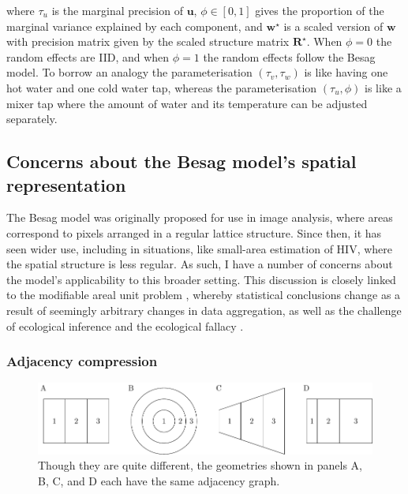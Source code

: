 \documentclass[a4paper, nobind]{templates/ociamthesis}
\begin{document}
where \(\tau_u\) is the marginal precision of \(\mathbf{u}\), \(\phi \in [0, 1]\) gives the proportion of the marginal variance explained by each component, and \(\mathbf{w}^\star\) is a scaled version of \(\mathbf{w}\) with precision matrix given by the scaled structure matrix \(\mathbf{R}^\star\).
When \(\phi = 0\) the random effects are IID, and when \(\phi = 1\) the random effects follow the Besag model.
To borrow an analogy \autocite{rue2020comment} the parameterisation \((\tau_v, \tau_w)\) is like having one hot water and one cold water tap, whereas the parameterisation \((\tau_u, \phi)\) is like a mixer tap where the amount of water and its temperature can be adjusted separately.

\hypertarget{concerns-about-the-besag-models-spatial-representation}{%
\subsection{Concerns about the Besag model's spatial representation}\label{concerns-about-the-besag-models-spatial-representation}}

The Besag model was originally proposed for use in image analysis, where areas correspond to pixels arranged in a regular lattice structure.
Since then, it has seen wider use, including in situations, like small-area estimation of HIV, where the spatial structure is less regular.
As such, I have a number of concerns about the model's applicability to this broader setting.
This discussion is closely linked to the modifiable areal unit problem \autocite{openshow1979million}, whereby statistical conclusions change as a result of seemingly arbitrary changes in data aggregation, as well as the challenge of ecological inference and the ecological fallacy \autocite{wakefield2010aggregation}.

\hypertarget{adjacency-compression}{%
\subsubsection{Adjacency compression}\label{adjacency-compression}}



\begin{figure}
\includegraphics[width=0.95\linewidth]{figures/beyond-borders/maup1} \caption{Though they are quite different, the geometries shown in panels A, B, C, and D each have the same adjacency graph.}\label{fig:maup1}
\end{figure}
\end{document}
